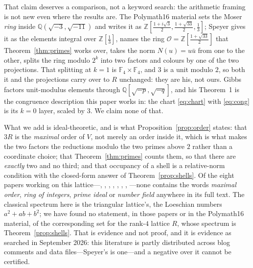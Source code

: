 \documentclass[11pt,reqno]{amsart}
\theoremstyle{plain}
\theoremstyle{definition}
\newcommand{\Z}{\mathbb{Z}}
\newcommand{\Q}{\mathbb{Q}}
\newcommand{\F}{\mathbb{F}}
\newcommand{\Lat}{R}
\newcommand{\Ok}{\mathcal{O}}
\begin{document}
That claim deserves a comparison, not a keyword search: the arithmetic framing
is not new even where the results are. The Polymath16
material \cite{Polymath} sets the Moser \emph{ring} inside
$\Q(\sqrt{-3},\sqrt{-11})$ and writes
it as $\Z[\tfrac{1+i\sqrt3}{2}, \tfrac{1+\sqrt{33}}{2}, \tfrac13]$; Speyer
\cite{Speyer} gives it as the elements integral over $\Z[\tfrac13]$, names the
ring $\Ok = \Z[\tfrac{1+\sqrt{33}}{2}]$ that Theorem~\ref{thm:primes} works over,
takes the norm $N(u) = u\bar u$ from one to the other, splits the ring modulo
$2^k$ into two factors and colours by one of the two projections. That splitting
at $k = 1$ is $\F_4 \times \F_4$, and $3$ is a unit modulo $2$, so both it and
the projections carry over to $\Lat$ unchanged: they are his, not ours. Gibbs
factors unit-modulus elements through $\Q[\sqrt{-p},\sqrt{-q}]$, and his
Theorem~1 \cite{GibbsRing} is the congruence description this paper works in:
the chart \eqref{eq:chart} with \eqref{eq:cong} is its $k = 0$ layer, scaled by
$3$. We claim none of that.

What we add is ideal-theoretic, and is what Proposition~\ref{prop:order} states:
that $3\Lat$ is the \emph{maximal} order of $V$, not merely an order inside it,
which is what makes the two factors the reductions modulo the two primes above
$2$ rather than a coordinate choice; that Theorem~\ref{thm:primes} counts them,
so that there are \emph{exactly} two and no third; and that occupancy of a shell
is a relative-norm condition with the closed-form answer of
Theorem~\ref{prop:shells}. Of the eight papers working on this
lattice---\cite{Ducz}, \cite{Parts}, \cite{Voronov}, \cite{Haugland},
\cite{Engel}, \cite{Ruhland}, \cite{Matolcsi},
\cite{DuczVarga}---none contains the words \emph{maximal order},
\emph{ring of integers}, \emph{prime ideal} or \emph{number field} anywhere in
its full text. The classical spectrum here is the triangular lattice's, the
Loeschian numbers $a^2+ab+b^2$; we have found no statement, in those papers or
in the Polymath16 material, of the corresponding set for the rank-$4$ lattice
$\Lat$, whose spectrum is Theorem~\ref{prop:shells}. That is evidence and not proof, and it is
evidence as searched in September 2026: this literature is partly distributed
across blog comments and data files---Speyer's is one---and a negative over it
cannot be certified.
\end{document}
